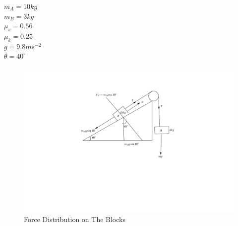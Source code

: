 \documentclass[12pt,a4paper]{article}
\begin{document}
$m_{A}=10kg$\\
$m_{B}=3kg$\\
$\mu_{s}=0.56$\\
$\mu_{k}=0.25$\\
$g=9.8ms^{-2}$\\
$\theta=40^\circ$
\begin{itemize}
\begin{figure}[h!]
\centering
\includegraphics[scale=0.9]{ramp.png}
\caption{Force Distribution on The Blocks}
\end{figure}


\end{itemize}
\end{document}

